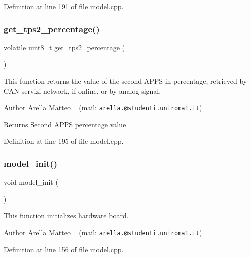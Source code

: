 Definition at line 191 of file model.\+cpp.

\mbox{\label{group___board__model__group_gae563bbe9e3c31913df498ebd7cbf6c10}} 
\subsubsection{\texorpdfstring{get\+\_\+tps2\+\_\+percentage()}{get\_tps2\_percentage()}}
{\footnotesize\ttfamily volatile uint8\+\_\+t get\+\_\+tps2\+\_\+percentage (\begin{DoxyParamCaption}{ }\end{DoxyParamCaption})}



This function returns the value of the second A\+P\+PS in percentage, retrieved by C\+AN servizi network, if online, or by analog signal. 

\begin{DoxyAuthor}{Author}
Arella Matteo ~\newline
 (mail\+: \href{mailto:arella.1646983@studenti.uniroma1.it}{\tt arella.@studenti.\+uniroma1.\+it})
\end{DoxyAuthor}
\begin{DoxyReturn}{Returns}
Second A\+P\+PS percentage value 
\end{DoxyReturn}


Definition at line 195 of file model.\+cpp.

\mbox{\label{group___board__model__group_gace5a444da39d4366693503c53f0841c2}} 
\subsubsection{\texorpdfstring{model\+\_\+init()}{model\_init()}}
{\footnotesize\ttfamily void model\+\_\+init (\begin{DoxyParamCaption}{ }\end{DoxyParamCaption})}



This function initializes hardware board. 

\begin{DoxyAuthor}{Author}
Arella Matteo ~\newline
 (mail\+: \href{mailto:arella.1646983@studenti.uniroma1.it}{\tt arella.@studenti.\+uniroma1.\+it}) 
\end{DoxyAuthor}


Definition at line 156 of file model.\+cpp.

